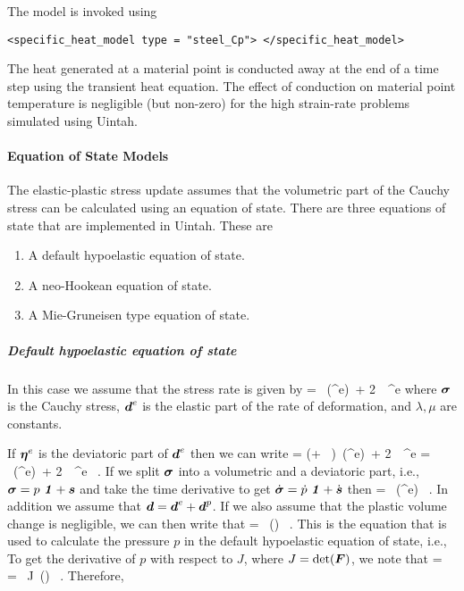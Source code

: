   The model is invoked using
  \begin{Verbatim}[fontsize=\footnotesize]
  <specific_heat_model type = "steel_Cp"> </specific_heat_model>
  \end{Verbatim}

  The heat generated at a material point is conducted away at the end of a
  time step using the transient heat equation.  The effect of conduction on
  material point temperature is negligible (but non-zero) for the high
  strain-rate problems simulated using Uintah.

\paragraph{Equation of State Models}
The elastic-plastic stress update assumes that the volumetric part of
the Cauchy stress can be calculated using an equation of state.  There
are three equations of state that are implemented in Uintah.  These
are
\begin{enumerate}
    \item A default hypoelastic equation of state.
    \item A neo-Hookean equation of state.
    \item A Mie-Gruneisen type equation of state.
\end{enumerate}

\subparagraph{Default hypoelastic equation of state}
In this case we assume that the stress rate is given by
\Beq
    \dot{\Bsig} = \lambda~\Tr(\Bd^e)~\Bone + 2~\mu~\Bd^e
\Eeq
where $\Bsig$ is the Cauchy stress, $\Bd^e$ is the elastic part of
the rate of deformation, and $\lambda, \mu$ are constants.

If $\Beta^e$ is the deviatoric part of $\Bd^e$ then we can write
\Beq
    \dot{\Bsig} = \left(\lambda + ~\mu\right)~\Tr(\Bd^e)~\Bone +
        2~\mu~\Beta^e = \kappa~\Tr(\Bd^e)~\Bone + 2~\mu~\Beta^e ~.
\Eeq
If we split $\Bsig$ into a volumetric and a deviatoric part, i.e.,
$\Bsig = p~\Bone + \Bs$ and take the time derivative to get
$\dot{\Bsig} = \dot{p}~\Bone + \dot{\Bs}$ then
\Beq
     = \kappa~\Tr(\Bd^e) ~.
\Eeq
In addition we assume that $\Bd = \Bd^e + \Bd^p$.  If we also assume that
the plastic volume change is negligible, we can then write that
\Beq
     = \kappa~\Tr(\Bd) ~.
\Eeq
This is the equation that is used to calculate the pressure $p$ in the
default hypoelastic equation of state, i.e.,
\Beq
\Eeq
To get the derivative of $p$ with respect to $J$, where $J = \det(\BF)$,
we note that
\Beq
     = ~ = ~J~\Tr(\Bd) ~.
\Eeq
Therefore,
\Beq
\Eeq

